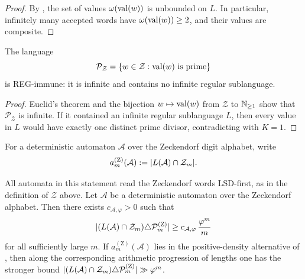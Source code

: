 \begin{proof}
  By
  ,
  the set of values \(\omega(\operatorname{val}(w))\) is unbounded on \(L\). In
  particular, infinitely many accepted words have
  \(\omega(\operatorname{val}(w))\ge2\), and their values are composite.
\end{proof}

\begin{corollary}
  \label{cor:zeckendorf-prime-language-reg-immune}
  The language
  \[
    \mathcal P_{\mathcal Z}
    =\{w\in\mathcal Z:\operatorname{val}(w)\text{ is prime}\}
  \]
  is REG-immune: it is infinite and contains no infinite regular
  sublanguage.
\end{corollary}

\begin{proof}
  Euclid's theorem and the bijection \(w\mapsto\operatorname{val}(w)\) from
  \(\mathcal Z\) to \(\mathbb{N}_{\ge1}\) show that
  \(\mathcal P_{\mathcal Z}\) is infinite. If it contained an infinite
  regular sublanguage \(L\), then every value in \(L\) would have
  exactly one distinct prime divisor, contradicting
  with \(K=1\).
\end{proof}

For a deterministic automaton \(\mathcal A\) over the Zeckendorf digit
alphabet, write
\[
  a_m^{(\mathrm Z)}(\mathcal A)
  :=\lvert L(\mathcal A)\cap\mathcal Z_m \rvert.
\]

\begin{corollary}
  \label{cor:zeck-symmetric-diff}
  All automata in this statement read the Zeckendorf words LSD-first, as
  in the definition of \(\mathcal Z\) above.
  Let \(\mathcal A\) be a deterministic automaton over the Zeckendorf
  alphabet. Then there exists \(c_{\mathcal A,\varphi}>0\) such that
  \[
    \lvert (L(\mathcal A)\cap\mathcal Z_m)
         \triangle\mathcal P_m^{(\mathrm Z)} \rvert
    \ge c_{\mathcal A,\varphi}\,\frac{\varphi^m}{m}
  \]
  for all sufficiently large \(m\). If
  \(a_m^{(\mathrm Z)}(\mathcal A)\) lies in the positive-density
  alternative of , then along the corresponding
  arithmetic progression of lengths one has the stronger bound
  \(\lvert (L(\mathcal A)\cap\mathcal Z_m)\triangle\mathcal P_m^{(\mathrm Z)} \rvert
  \gg \varphi^m\).
\end{corollary}

